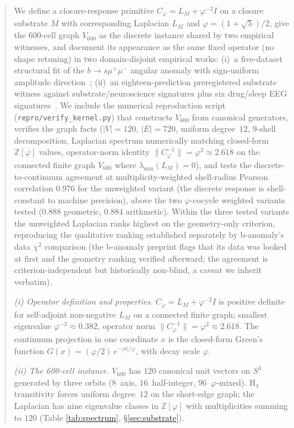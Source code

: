 \documentclass[11pt]{article}
\newcommand{\Ph}{\varphi}
\newcommand{\Cph}{C_{\Ph}}
\newcommand{\Rsixhundred}{V_{600}}
\begin{document}
\begin{abstract}
We define a closure-response primitive $\Cph = L_M + \Ph^{-2} I$ on
a closure substrate $M$ with corresponding Laplacian $L_M$ and
$\Ph = (1+\sqrt{5})/2$, give the 600-cell graph $\Rsixhundred$ as
the discrete instance shared by two empirical witnesses, and
document its appearance as the same fixed operator (no shape
retuning) in two domain-disjoint empirical
works: (i)~a five-dataset structural fit of the
$b\to s\mu^{+}\mu^{-}$ angular anomaly with sign-uniform amplitude
direction~\citep{SmartBAnomaly2026}; (ii)~an eighteen-prediction
preregistered substrate witness against substrate/neuroscience
signatures plus six drug/sleep EEG
signatures~\citep{SmartAriaChess2026}. We
include the numerical reproduction script
(\texttt{repro/verify\_kernel.py}) that constructs $\Rsixhundred$
from canonical generators, verifies the graph facts
($|V|=120$, $|E|=720$, uniform degree~$12$, $9$-shell decomposition,
Laplacian spectrum numerically matching closed-form $\mathbb{Z}[\Ph]$
values, operator-norm identity $\|\Cph^{-1}\|=\Ph^{2}\approx 2.618$
on the connected finite graph $\Rsixhundred$ where
$\lambda_{\min}(L_M)=0$), and tests the discrete-to-continuum
agreement at multiplicity-weighted shell-radius Pearson
correlation $0.976$ for the unweighted variant (the discrete
response is shell-constant to machine precision), above the two
$\Ph$-cocycle weighted variants tested ($0.888$ geometric, $0.884$
arithmetic). Within the three
tested variants the unweighted Laplacian ranks highest on the
geometry-only criterion, reproducing the qualitative ranking
established separately by b-anomaly's data $\chi^{2}$ comparison
(the b-anomaly preprint flags that its data was looked at first
and the geometry ranking verified afterward; the agreement is
criterion-independent but historically non-blind, a caveat we
inherit verbatim).

\noindent\emph{(i) Operator definition and properties.}
$\Cph = L_M + \Ph^{-2} I$ is positive definite for self-adjoint
non-negative $L_M$ on a connected finite graph; smallest eigenvalue
$\Ph^{-2} \approx 0.382$, operator norm
$\|\Cph^{-1}\| = \Ph^{2} \approx 2.618$. The continuum projection
in one coordinate $x$ is the closed-form Green's function
$G(x) = (\Ph/2)\, e^{-|x|/\Ph}$, with decay scale $\Ph$.

\noindent\emph{(ii) The 600-cell instance.}
$\Rsixhundred$ has $120$ canonical unit vectors on $S^{3}$
generated by three orbits ($8$~axis, $16$~half-integer,
$96$~$\Ph$-mixed). H$_4$ transitivity forces uniform degree~$12$
on the short-edge graph; the Laplacian has nine eigenvalue classes
in $\mathbb{Z}[\Ph]$ with multiplicities summing to $120$ (Table
\ref{tab:spectrum}, \S\ref{sec:substrate}).


\end{abstract}
\end{document}
